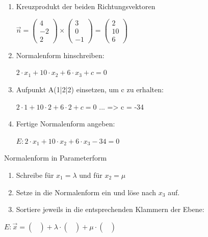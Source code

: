 \documentclass[paper=a6,landscape,ngerman,twoside=true,fontsize=12pt]{scrartcl}
\begin{document}
\begin{antwort}
	\normalsize
	\begin{enumerate} 
		\item Kreuzprodukt der beiden Richtungsvektoren
		
		$\vec{n}=\left(\begin{array}{c} 4 \\ -2 \\ 2\end{array} \right) \times \left(\begin{array}{c} 3 \\0 \\ -1\end{array} \right)=\left(\begin{array}{c} 2 \\10 \\ 6\end{array} \right)$
		
		\item Normalenform hinschreiben: 
		
		$2 \cdot x_1 + 10 \cdot x_2+6 \cdot x_3 + c = 0$
		
		\item Aufpunkt A(1|2|2) einsetzen, um c zu erhalten: 
		
		$2 \cdot 1 + 10 \cdot 2+6 \cdot 2 + c = 0$
		... => c = -34
		
		\item Fertige Normalenform angeben: 
		
		$E: 2 \cdot x_1 + 10 \cdot x_2+6 \cdot x_3  -34 = 0$
			
	\end{enumerate} 
	
\end{antwort}
\begin{frage}
	\LARGE
	Normalenform in Parameterform
	
\end{frage}
\begin{antwort}
	\normalsize
	\begin{enumerate} 
		\item Schreibe für $x_1 = \lambda$ und für $x_2=\mu$	
		\item Setze in die Normalenform ein und löse nach $x_3$ auf.
		\item Sortiere jeweils in die entsprechenden Klammern der Ebene:			
	\end{enumerate} 
	$E:\vec{x}=\left(\begin{array}{c}  \\  \\ \end{array} \right)+\lambda \cdot \left(\begin{array}{c}  \\  \\ \end{array} \right)+\mu \cdot \left(\begin{array}{c}  \\ \\ \end{array} \right)$
	
\end{antwort}
\end{document}
